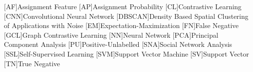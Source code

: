 \begin{acronym}

    [AF]{Assignment Feature}
    [AP]{Assignment Probability}
    [CL]{Contrastive Learning}
    [CNN]{Convolutional Neural Network}
    [DBSCAN]{Density Based Spatial Clustering of Applications with Noise}
    [EM]{Expectation-Maximization}
    [FN]{False Negative}
    [GCL]{Graph Contrastive Learning}
    [NN]{Neural Network}
    [PCA]{Principal Component Analysis}
    [PU]{Positive-Unlabelled}
    [SNA]{Social Network Analysis}    
    [SSL]{Self-Supervised Learning}
    [SVM]{Support Vector Machine}
    [SV]{Support Vector}
    [TN]{True Negative}

\end{acronym}